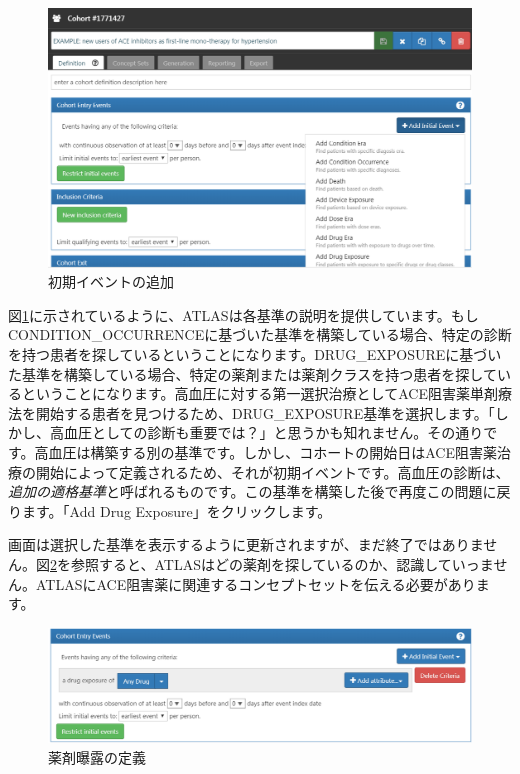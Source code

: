 \documentclass[
  11pt]{book}
\theoremstyle{definition}
\theoremstyle{definition}
\theoremstyle{definition}
\theoremstyle{definition}
\theoremstyle{remark}
\begin{document}
\begin{figure}

{\centering \includegraphics[width=1\linewidth]{images/Cohorts/ATLAS-initialevent} 

}

\caption{初期イベントの追加}\label{fig:ATLASinitialevent}
\end{figure}

図\ref{fig:ATLASinitialevent}に示されているように、ATLASは各基準の説明を提供しています。もしCONDITION\_OCCURRENCEに基づいた基準を構築している場合、特定の診断を持つ患者を探しているということになります。DRUG\_EXPOSUREに基づいた基準を構築している場合、特定の薬剤または薬剤クラスを持つ患者を探しているということになります。高血圧に対する第一選択治療としてACE阻害薬単剤療法を開始する患者を見つけるため、DRUG\_EXPOSURE基準を選択します。「しかし、高血圧としての診断も重要では？」と思うかも知れません。その通りです。高血圧は構築する別の基準です。しかし、コホートの開始日はACE阻害薬治療の開始によって定義されるため、それが初期イベントです。高血圧の診断は、\emph{追加の適格基準}と呼ばれるものです。この基準を構築した後で再度この問題に戻ります。「Add Drug Exposure」をクリックします。

画面は選択した基準を表示するように更新されますが、まだ終了ではありません。図\ref{fig:ATLASdrugexposure}を参照すると、ATLASはどの薬剤を探しているのか、認識していっません。ATLASにACE阻害薬に関連するコンセプトセットを伝える必要があります。

\begin{figure}

{\centering \includegraphics[width=1\linewidth]{images/Cohorts/ATLAS-drugexposure} 

}

\caption{薬剤曝露の定義}\label{fig:ATLASdrugexposure}
\end{figure}
\end{document}
